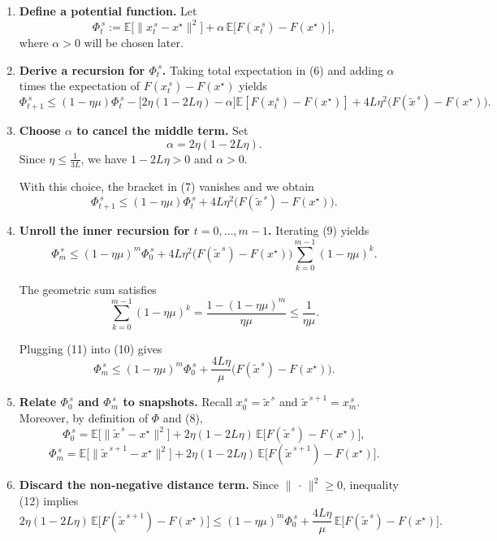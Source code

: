 \documentclass{article}
\begin{document}
\begin{enumerate}[label=[Step \arabic*], leftmargin=*]
\item \textbf{Define a potential function.}  
Let
\[
\Phi_{t}^{\,s}:= \mathbb{E}\!\bigl[\|x_{t}^{\,s}-x^\star\|^{2}\bigr]
+ \alpha\,\mathbb{E}\!\bigl[F(x_{t}^{\,s})-F(x^\star)\bigr],
\]
where $\alpha>0$ will be chosen later.

\item \textbf{Derive a recursion for $\Phi_{t}^{\,s}$.}  
Taking total expectation in (6) and adding $\alpha$ times the expectation of $F(x_{t}^{\,s})-F(x^\star)$ yields
\[
\Phi_{t+1}^{\,s}
\le (1-\eta\mu)\Phi_{t}^{\,s}
-\bigl[2\eta(1-2L\eta)-\alpha\bigr]\mathbb{E}[F(x_{t}^{\,s})-F(x^\star)]
+4L\eta^{2}\bigl(F(\tilde{x}^{\,s})-F(x^\star)\bigr). \tag{7}
\]

\item \textbf{Choose $\alpha$ to cancel the middle term.}  
Set
\[
\alpha = 2\eta(1-2L\eta). \tag{8}
\]
Since $\eta\le \frac{1}{3L}$, we have $1-2L\eta>0$ and $\alpha>0$.

With this choice, the bracket in (7) vanishes and we obtain
\[
\Phi_{t+1}^{\,s}
\le (1-\eta\mu)\Phi_{t}^{\,s}
+4L\eta^{2}\bigl(F(\tilde{x}^{\,s})-F(x^\star)\bigr). \tag{9}
\]

\item \textbf{Unroll the inner recursion for $t=0,\dots,m-1$.}  
Iterating (9) yields
\[
\Phi_{m}^{\,s}
\le (1-\eta\mu)^{m}\Phi_{0}^{\,s}
+4L\eta^{2}\bigl(F(\tilde{x}^{\,s})-F(x^\star)\bigr)
\sum_{k=0}^{m-1}(1-\eta\mu)^{k}. \tag{10}
\]

The geometric sum satisfies
\[
\sum_{k=0}^{m-1}(1-\eta\mu)^{k}
=\frac{1-(1-\eta\mu)^{m}}{\eta\mu}
\le\frac{1}{\eta\mu}. \tag{11}
\]

Plugging (11) into (10) gives
\[
\Phi_{m}^{\,s}
\le (1-\eta\mu)^{m}\Phi_{0}^{\,s}
+\frac{4L\eta}{\mu}\bigl(F(\tilde{x}^{\,s})-F(x^\star)\bigr). \tag{12}
\]

\item \textbf{Relate $\Phi_{0}^{\,s}$ and $\Phi_{m}^{\,s}$ to snapshots.}  
Recall $x_{0}^{\,s}=\tilde{x}^{\,s}$ and $\tilde{x}^{\,s+1}=x_{m}^{\,s}$. Moreover, by definition of $\Phi$ and (8),
\[
\Phi_{0}^{\,s}= \mathbb{E}\!\bigl[\|\tilde{x}^{\,s}-x^\star\|^{2}\bigr]
+2\eta(1-2L\eta)\,\mathbb{E}\!\bigl[F(\tilde{x}^{\,s})-F(x^\star)\bigr],
\]
\[
\Phi_{m}^{\,s}= \mathbb{E}\!\bigl[\|\tilde{x}^{\,s+1}-x^\star\|^{2}\bigr]
+2\eta(1-2L\eta)\,\mathbb{E}\!\bigl[F(\tilde{x}^{\,s+1})-F(x^\star)\bigr].
\]

\item \textbf{Discard the non‑negative distance term.}  
Since $\|\,\cdot\,\|^{2}\ge0$, inequality (12) implies
\[
2\eta(1-2L\eta)\,\mathbb{E}\!\bigl[F(\tilde{x}^{\,s+1})-F(x^\star)\bigr]
\le (1-\eta\mu)^{m}\Phi_{0}^{\,s}
+\frac{4L\eta}{\mu}\,\mathbb{E}\!\bigl[F(\tilde{x}^{\,s})-F(x^\star)\bigr]. \tag{13}
\]


\end{enumerate}
\end{document}
